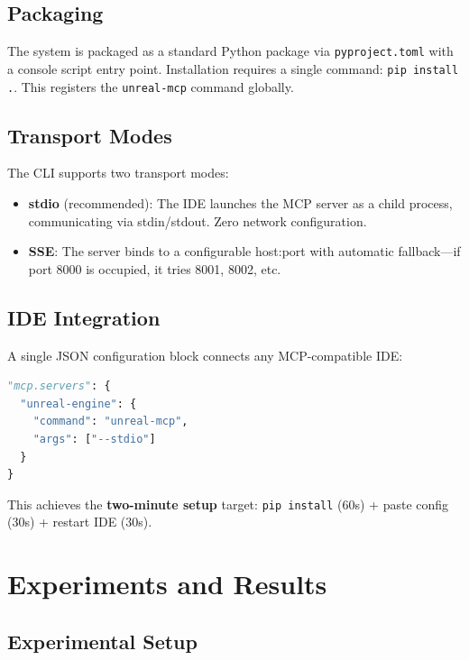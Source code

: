 \documentclass[conference]{IEEEtran}
\begin{document}
\subsection{Packaging}

The system is packaged as a standard Python package via \texttt{pyproject.toml} with a console script entry point. Installation requires a single command: \texttt{pip install .}. This registers the \texttt{unreal-mcp} command globally.

\subsection{Transport Modes}

The CLI supports two transport modes:

\begin{itemize}[leftmargin=*]
    \item \textbf{stdio} (recommended): The IDE launches the MCP server as a child process, communicating via stdin/stdout. Zero network configuration.
    \item \textbf{SSE}: The server binds to a configurable host:port with automatic fallback---if port 8000 is occupied, it tries 8001, 8002, etc.
\end{itemize}

\subsection{IDE Integration}

A single JSON configuration block connects any MCP-compatible IDE:

\begin{lstlisting}[language=Python, caption=IDE configuration (VS Code example)]
"mcp.servers": {
  "unreal-engine": {
    "command": "unreal-mcp",
    "args": ["--stdio"]
  }
}
\end{lstlisting}

This achieves the \textbf{two-minute setup} target: \texttt{pip install} (60s) + paste config (30s) + restart IDE (30s).

\section{Experiments and Results}

\subsection{Experimental Setup}
\end{document}

